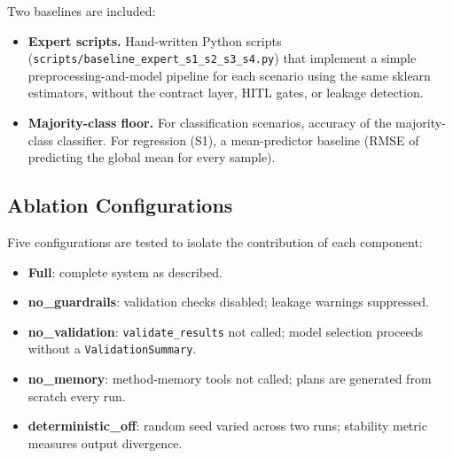 Two baselines are included:

\begin{itemize}
  \item \textbf{Expert scripts.} Hand-written Python scripts
    (\texttt{scripts/baseline\_expert\_s1\_s2\_s3\_s4.py}) that implement a
    simple preprocessing-and-model pipeline for each scenario using the same
    sklearn estimators, without the contract layer, HITL gates, or leakage
    detection.
  \item \textbf{Majority-class floor.} For classification scenarios, accuracy
    of the majority-class classifier.
    For regression (S1), a mean-predictor baseline (RMSE of predicting the
    global mean for every sample).
\end{itemize}

\subsection{Ablation Configurations}

Five configurations are tested to isolate the contribution of each component:

\begin{itemize}
  \item \textbf{Full}: complete system as described.
  \item \textbf{no\_guardrails}: validation checks disabled; leakage warnings
    suppressed.
  \item \textbf{no\_validation}: \texttt{validate\_results} not called;
    model selection proceeds without a \texttt{ValidationSummary}.
  \item \textbf{no\_memory}: method-memory tools not called; plans are
    generated from scratch every run.
  \item \textbf{deterministic\_off}: random seed varied across two runs;
    stability metric measures output divergence.
\end{itemize}
